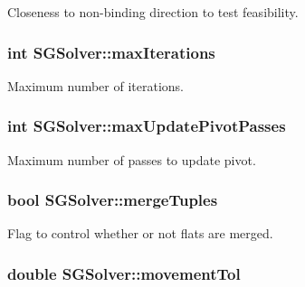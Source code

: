 Closeness to non-\/binding direction to test feasibility. \hypertarget{class_s_g_solver_a8946fb030f52af5bf77a2f519efee20e}{
\subsubsection[{max\+Iterations}]{\setlength{\rightskip}{0pt plus 5cm}int S\+G\+Solver\+::max\+Iterations\hspace{0.3cm}{\ttfamily [private]}}}\label{class_s_g_solver_a8946fb030f52af5bf77a2f519efee20e}
Maximum number of iterations. \hypertarget{class_s_g_solver_abbdae6d120999a7602967e33d7a5b50e}{
\subsubsection[{max\+Update\+Pivot\+Passes}]{\setlength{\rightskip}{0pt plus 5cm}int S\+G\+Solver\+::max\+Update\+Pivot\+Passes\hspace{0.3cm}{\ttfamily [private]}}}\label{class_s_g_solver_abbdae6d120999a7602967e33d7a5b50e}
Maximum number of passes to update pivot. \hypertarget{class_s_g_solver_af25dda99eb759d1fcb58cd0d98f9a4c2}{
\subsubsection[{merge\+Tuples}]{\setlength{\rightskip}{0pt plus 5cm}bool S\+G\+Solver\+::merge\+Tuples\hspace{0.3cm}{\ttfamily [private]}}}\label{class_s_g_solver_af25dda99eb759d1fcb58cd0d98f9a4c2}
Flag to control whether or not flats are merged. \hypertarget{class_s_g_solver_afff01bc0ddca3d42a50bd13f99d6553d}{
\subsubsection[{movement\+Tol}]{\setlength{\rightskip}{0pt plus 5cm}double S\+G\+Solver\+::movement\+Tol\hspace{0.3cm}{\ttfamily [private]}}}\label{class_s_g_solver_afff01bc0ddca3d42a50bd13f99d6553d}
